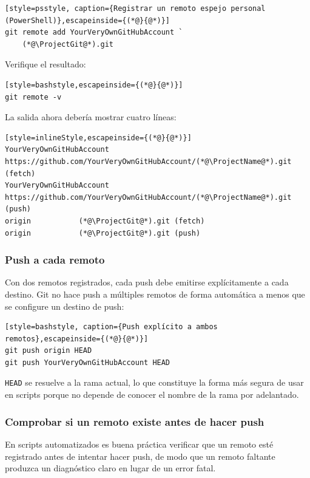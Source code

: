 \begin{lstlisting}[style=psstyle, caption={Registrar un remoto espejo personal (PowerShell)},escapeinside={(*@}{@*)}]
git remote add YourVeryOwnGitHubAccount `
    (*@\ProjectGit@*).git
\end{lstlisting}

Verifique el resultado:

\begin{lstlisting}[style=bashstyle,escapeinside={(*@}{@*)}]
git remote -v
\end{lstlisting}

La salida ahora debería mostrar cuatro líneas:

\begin{lstlisting}[style=inlineStyle,escapeinside={(*@}{@*)}]
YourVeryOwnGitHubAccount  https://github.com/YourVeryOwnGitHubAccount/(*@\ProjectName@*).git (fetch)
YourVeryOwnGitHubAccount  https://github.com/YourVeryOwnGitHubAccount/(*@\ProjectName@*).git (push)
origin           (*@\ProjectGit@*).git (fetch)
origin           (*@\ProjectGit@*).git (push)
\end{lstlisting}

\subsubsection{Push a cada remoto}

Con dos remotos registrados, cada push debe emitirse explícitamente a
cada destino. Git no hace push a múltiples remotos de forma automática
a menos que se configure un destino de push:

\begin{lstlisting}[style=bashstyle, caption={Push explícito a ambos remotos},escapeinside={(*@}{@*)}]
git push origin HEAD
git push YourVeryOwnGitHubAccount HEAD
\end{lstlisting}

\texttt{HEAD} se resuelve a la rama actual, lo que constituye la forma más segura
de usar en scripts porque no depende de conocer el nombre de la rama
por adelantado.

\subsubsection{Comprobar si un remoto existe antes de hacer push}

En scripts automatizados es buena práctica verificar que un remoto esté
registrado antes de intentar hacer push, de modo que un remoto faltante produzca
un diagnóstico claro en lugar de un error fatal.

